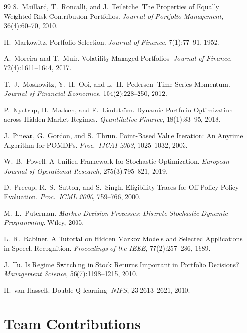 \documentclass[11pt]{article}
\theoremstyle{plain1}
\theoremstyle{definition1}
\newcommand{\1}{\mathbf{1}}
\begin{document}
\begin{thebibliography}{99}
 S.\ Maillard, T.\ Roncalli, and J.\ Teiletche. The Properties of Equally Weighted Risk Contribution Portfolios. \emph{Journal of Portfolio Management}, 36(4):60--70, 2010.

 H.\ Markowitz. Portfolio Selection. \emph{Journal of Finance}, 7(1):77--91, 1952.

 A.\ Moreira and T.\ Muir. Volatility-Managed Portfolios. \emph{Journal of Finance}, 72(4):1611--1644, 2017.

 T.\ J.\ Moskowitz, Y.\ H.\ Ooi, and L.\ H.\ Pedersen. Time Series Momentum. \emph{Journal of Financial Economics}, 104(2):228--250, 2012.

 P.\ Nystrup, H.\ Madsen, and E.\ Lindstr\"om. Dynamic Portfolio Optimization across Hidden Market Regimes. \emph{Quantitative Finance}, 18(1):83--95, 2018.

 J.\ Pineau, G.\ Gordon, and S.\ Thrun. Point-Based Value Iteration: An Anytime Algorithm for POMDPs. \emph{Proc.\ IJCAI 2003}, 1025--1032, 2003.

 W.\ B.\ Powell. A Unified Framework for Stochastic Optimization. \emph{European Journal of Operational Research}, 275(3):795--821, 2019.

 D.\ Precup, R.\ S.\ Sutton, and S.\ Singh. Eligibility Traces for Off-Policy Policy Evaluation. \emph{Proc.\ ICML 2000}, 759--766, 2000.

 M.\ L.\ Puterman. \emph{Markov Decision Processes: Discrete Stochastic Dynamic Programming}. Wiley, 2005.

 L.\ R.\ Rabiner. A Tutorial on Hidden Markov Models and Selected Applications in Speech Recognition. \emph{Proceedings of the IEEE}, 77(2):257--286, 1989.

 J.\ Tu. Is Regime Switching in Stock Returns Important in Portfolio Decisions? \emph{Management Science}, 56(7):1198--1215, 2010.

 H.\ van Hasselt. Double Q-learning. \emph{NIPS}, 23:2613--2621, 2010.

\end{thebibliography}

\appendix
\section*{Team Contributions}
\end{document}
